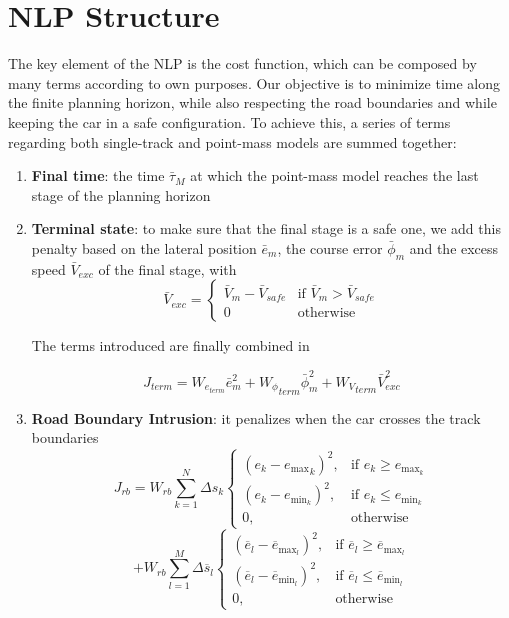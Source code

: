 \documentclass[a4paper, onecolumn, 12pt]{article}
\begin{document}
\newpage
\section{NLP Structure}

The key element of the NLP is the cost function, which can be composed by many terms according to own purposes.
Our objective is to minimize time along the finite planning horizon, while also respecting the road
boundaries and while keeping the car in a safe configuration. 
To achieve this, a series of terms regarding both single-track and point-mass models are summed together:
\begin{enumerate}
    \item \textbf{Final time}: the time $\bar{\tau}_M$ at which the point-mass model reaches the last stage of the planning horizon
    \item \textbf{Terminal state}: to make sure that the final stage is a safe one, we add this penalty based on the 
    lateral position ${\bar{e}}_m$, the course error ${\bar{\phi}}_m$ and the excess speed ${\bar{V}}_{exc}$ of the final stage, with
    \begin{equation}
    {\bar{V}}_{exc} = 
    \left\{
	\begin{array}{ll}
		{\bar{V}}_m - {{\bar{V}}_{safe}}
        & \mbox{if } {\bar{V}}_m > {{\bar{V}}_{safe}} \\
	0 & \mbox{otherwise }
	\end{array}
    \right.
    \end{equation}

    The terms introduced are finally combined in
    
    \begin{equation}{J}_{term} = W_{e_{term}}{\bar{e}}_m^2 + {W_{\phi}}_{term}{\bar{\phi}}_m^2 + {W_V}_{term}{\bar{V}}_{exc}^2
    \end{equation}

    \item \textbf{Road Boundary Intrusion}: it penalizes when the car crosses the track boundaries
    \begin{equation}
    J_{rb} = W_{rb}\sum_{k=1}^{N} \Delta s_k \begin{cases}
    (e_k - {e_{\text{max}}}_k)^2, & \text{if } e_k \geq e_{\text{max}_k} \\
    (e_k - e_{\text{min}_k})^2, & \text{if } e_k \leq e_{\text{min}_k} \\
    0, & \text{otherwise}
    \end{cases}
    \end{equation}
    \[  + W_{rb}\sum_{l=1}^{M} \Delta\overline{s}_l \begin{cases}
    (\overline{e}_l - \overline{e}_{\text{max}_l})^2, & \text{if } \overline{e}_l \geq \overline{e}_{\text{max}_l} \\
    (\overline{e}_l - \overline{e}_{\text{min}_l})^2, & \text{if } \overline{e}_l \leq \overline{e}_{\text{min}_l} \\
    0, & \text{otherwise}
    \end{cases}
    \]


\end{enumerate}
\end{document}
